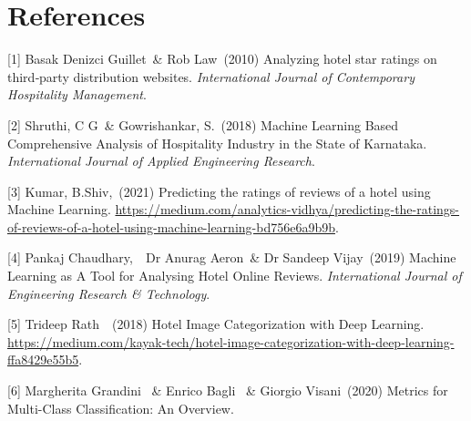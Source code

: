 \documentclass{article}
\begin{document}
\section*{References}
\medskip
\small
[1] Basak Denizci Guillet\ \& Rob Law\ (2010) Analyzing hotel star ratings on third‐party distribution websites. {\it International Journal of Contemporary Hospitality Management}.

[2] Shruthi, C G\ \& Gowrishankar, S.\ (2018) Machine Learning Based Comprehensive Analysis of Hospitality Industry in the State of Karnataka. {\it International Journal of Applied Engineering Research}.

[3] Kumar, B.Shiv,\ (2021) Predicting the ratings of reviews of a hotel using Machine Learning. \href{https://medium.com/analytics-vidhya/predicting-the-ratings-of-reviews-of-a-hotel-using-machine-learning-bd756e6a9b9b}{https://medium.com/analytics-vidhya/predicting-the-ratings-of-reviews-of-a-hotel-using-machine-learning-bd756e6a9b9b}.

[4] Pankaj Chaudhary,\ \ Dr Anurag Aeron\ \& Dr Sandeep Vijay\ (2019) Machine Learning as A Tool for Analysing Hotel Online Reviews. {\it International Journal of Engineering Research & Technology}.

[5] Trideep Rath\ \ (2018) Hotel Image Categorization with Deep Learning. \href{https://medium.com/kayak-tech/hotel-image-categorization-with-deep-learning-ffa8429e55b5}{https://medium.com/kayak-tech/hotel-image-categorization-with-deep-learning-ffa8429e55b5}.

[6] Margherita Grandini \ \& Enrico Bagli \ \& Giorgio Visani\ (2020) Metrics for Multi-Class Classification: An Overview.
\end{document}
